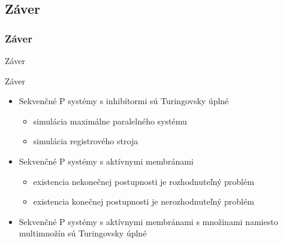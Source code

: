 \subsection{Záver} %
\label{sub:zaver}

\begin{frame}[c]\frametitle{Záver}
  \centering
  \Huge Záver
\end{frame}

\begin{frame}[t]{Záver}
  \begin{itemize}
    \item Sekvenčné P systémy s inhibítormi sú Turingovsky úplné
    \begin{itemize}
      \item simulácia maximálne paralelného systému
      \item simulácia registrového stroja
    \end{itemize}
    \item Sekvenčné P systémy s aktívnymi membránami
    \begin{itemize}
      \item existencia nekonečnej postupnosti je rozhodnuteľný problém
      \item existencia konečnej postupnosti je nerozhodnuteľný problém
    \end{itemize}
    \item Sekvenčné P systémy s aktívnymi membránami s množinami namiesto multimnožín sú Turingovsky úplné
  \end{itemize}  
\end{frame}

